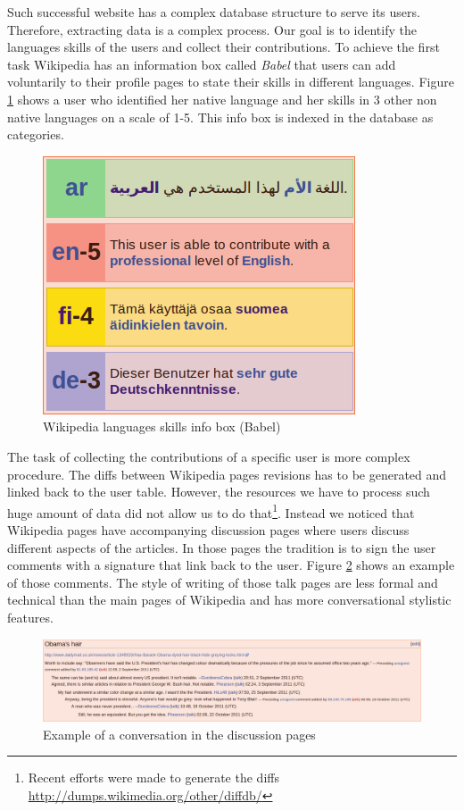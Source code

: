 \documentclass[11pt]{article}
\begin{document}
Such successful website has a complex database structure to serve its users. Therefore, extracting data is a complex process. Our goal is to identify the languages skills of the users and collect their contributions. To achieve the first task Wikipedia has an information box called \emph{Babel} that users can add voluntarily to their profile pages to state their skills in different languages. Figure \ref{babel} shows a user who identified her native language and her skills in 3 other non native languages on a scale of 1-5. This info box is indexed in the database as categories.

\begin{figure}[htp]
\centering
\includegraphics[scale=0.60]{babel}
\caption{Wikipedia languages skills info box (Babel)}
\label{babel}
\end{figure}

The task of collecting the contributions of a specific user is more complex procedure. The diffs between Wikipedia pages revisions has to be generated and linked back to the user table. However, the resources we have to process such huge amount of data did not allow us to do that\footnote{Recent efforts were made to generate the diffs \url{http://dumps.wikimedia.org/other/diffdb/}}. Instead we noticed that Wikipedia pages have accompanying discussion pages where users discuss different aspects of the articles. In those pages the tradition is to sign the user comments with a signature that link back to the user. Figure \ref{obama} shows an example of those comments. The style of writing of those talk pages are less formal and technical than the main pages of Wikipedia and has more conversational stylistic features.

\begin{figure}[Htp]
\centering
\includegraphics[scale=0.285]{obama.png}
\caption{Example of a conversation in the discussion pages}
\label{obama}
\end{figure}
\end{document}
